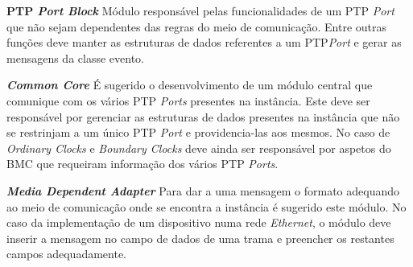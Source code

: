 \textbf{PTP \textit{Port Block}} Módulo responsável pelas funcionalidades de um PTP \textit{Port} que não sejam dependentes das regras do meio de comunicação. Entre outras funções deve manter as estruturas de dados referentes a um PTP\textit{Port} e gerar as mensagens da classe evento. 

\textbf{\textit{Common Core}} É sugerido o desenvolvimento de um módulo central que comunique com os vários PTP \textit{Ports} presentes na instância. Este deve ser responsável por gerenciar as estruturas de dados presentes na instância que não se restrinjam a um único PTP \textit{Port} e providencia-las aos mesmos. No caso de \textit{Ordinary Clocks} e \textit{Boundary Clocks} deve ainda ser responsável por aspetos do BMC que requeiram informação dos vários PTP \textit{Ports}.

\textbf{\textit{Media Dependent Adapter}} Para dar a uma mensagem o formato adequando ao meio de comunicação onde se encontra a instância é sugerido este módulo. No caso da implementação de um dispositivo numa rede \textit{Ethernet}, o módulo deve inserir a mensagem no campo de dados de uma trama e preencher os restantes campos adequadamente.  